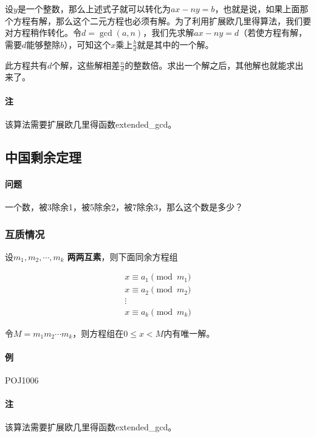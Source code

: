 设$y$是一个整数，那么上述式子就可以转化为$ax-ny=b$，也就是说，如果上面那个方程有解，那么这个二元方程也必须有解。为了利用扩展欧几里得算法，我们要对方程稍作转化。令$d=\gcd(a,n)$，我们先求解$ax-ny=d$（若使方程有解，需要$d$能够整除$b$），可知这个$x$乘上$\frac{b}{d}$就是其中的一个解。

此方程共有$d$个解，这些解相差$\frac{n}{d}$的整数倍。求出一个解之后，其他解也就能求出来了。

\paragraph{注} 该算法需要扩展欧几里得函数extended\_gcd。



\subsection{中国剩余定理}

\paragraph{问题} 一个数，被3除余1，被5除余2，被7除余3，那么这个数是多少？

\subsubsection{互质情况}

设$m_1, m_2, \cdots, m_k$ \textbf{两两互素}，则下面同余方程组

\begin{equation}
  \begin{array}{c}
    x \equiv a_1 \pmod{m_1} \\
    x \equiv a_2 \pmod{m_2} \\
    \vdots \\
    x \equiv a_k \pmod{m_k}
  \end{array}
\end{equation}

令$M=m_1m_2 \cdots m_k$，则方程组在$0 \leq x < M$内有唯一解。

\paragraph{例} POJ1006

\paragraph{注} 该算法需要扩展欧几里得函数extended\_gcd。

